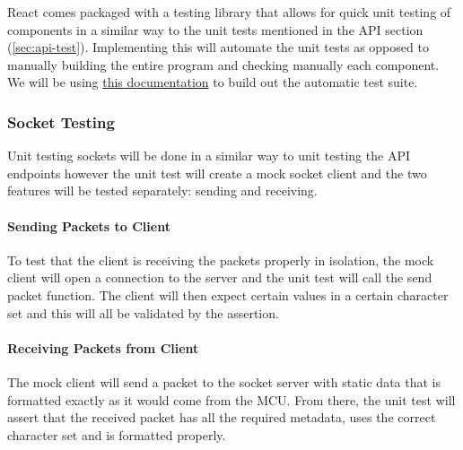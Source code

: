 React comes packaged with a testing library that allows for quick unit testing of components in a similar way to the unit tests mentioned in the API section (\ref{sec:api-test}). Implementing this will automate the unit tests as opposed to manually building the entire program and checking manually each component. We will be using \href{https://testing-library.com/docs/react-testing-library}{this documentation} to build out the automatic test suite.

\subsubsection{Socket Testing}
Unit testing sockets will be done in a similar way to unit testing the API endpoints however the unit test will create a mock socket client and the two features will be tested separately: sending and receiving.

\paragraph{Sending Packets to Client}
To test that the client is receiving the packets properly in isolation, the mock client will open a connection to the server and the unit test will call the send packet function. The client will then expect certain values in a certain character set and this will all be validated by the assertion.
\paragraph{Receiving Packets from Client}
The mock client will send a packet to the socket server with static data that is formatted exactly as it would come from the MCU. From there, the unit test will assert that the received packet has all the required metadata, uses the correct character set and is formatted properly.